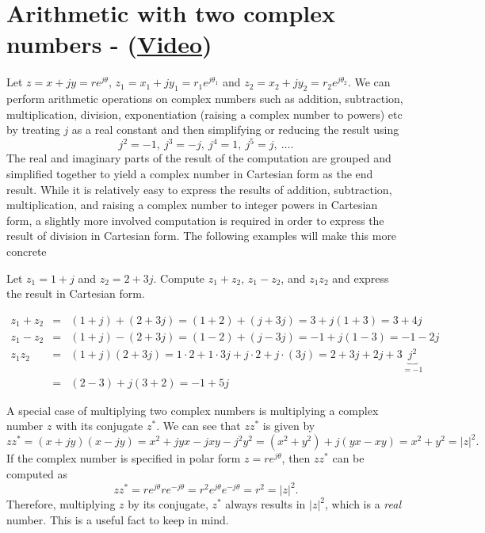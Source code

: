 \section{Arithmetic with two complex numbers - (\href{https://youtu.be/XFXuDNh4kOA}{Video})}
Let $z = x + j y = r e^{j \theta}$,  $z_1 = x_1 + j y_1 = r_1 e^{j \theta_1}$ and $z_2 = x_2 + j y_2  = r_2 e^{j \theta_2}$. 
We can perform arithmetic operations on complex numbers such as addition, subtraction, multiplication,
division, exponentiation (raising a complex number to powers) etc by treating $j$ as a real constant and
then simplifying or reducing the result using 
\[
j^2 = -1, \ j^3 = -j, \ j^4 = 1, \ j^5 = j, \ \ldots.
\]
The real and imaginary parts of the result of the computation are grouped and simplified together to yield 
a complex number in Cartesian form as the end result.  
While it is relatively easy to express the results of addition, subtraction, multiplication, and raising a complex number to integer powers in Cartesian form, a slightly more involved computation is required in order to express the result
of division in Cartesian form.
The following examples will make this more concrete

\begin{example}
Let $z_1 = 1+j$ and $z_2 = 2 + 3j$. Compute $z_1+z_2$, $z_1-z_2$, and $z_1 z_2$ and express the result in Cartesian form.

\begin{eqnarray*}
z_1 + z_2 & = & (1+j) + (2+3j) = (1+2) + (j+3j) = 3 + j(1+3) = 3 + 4j \\
z_1 - z_2 & = & (1+j) - (2+3j) = (1-2) + (j-3j) = -1 + j(1-3) = -1 -2j \\
z_1 z_2 & = & (1+j) (2+3j) = 1 \cdot 2 + 1 \cdot 3j +j \cdot 2 + j \cdot (3j) = 2 + 3j + 2j + 3\underbrace{j^2}_{=-1}\\
& = & (2-3) + j (3+2) = -1 + 5j
\end{eqnarray*}
\end{example}

A special case of multiplying two complex numbers is multiplying a complex number $z$ with its conjugate $z^*$.
We can see that $zz^*$ is given by
\[
zz^* = (x+jy)(x-jy) = x^2 +j yx - jxy -j^2y^2 = (x^2+y^2)+j(yx-xy) = x^2+y^2 = |z|^2.
\]
If the complex number is specified in polar form $z=re^{j\theta}$, then $zz^*$ can be computed as
\[
zz^* = r e^{j\theta} r e^{-j \theta} = r^2 e^{j \theta} e^{-j \theta} = r^2 = |z|^2.
\]
Therefore, multiplying $z$ by its conjugate, $z^*$ always results in $|z|^2$, which is a {\em real} number. 
This is a useful fact to keep in mind. 

